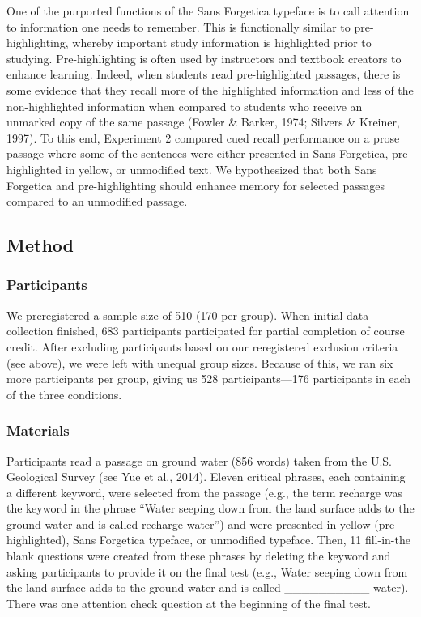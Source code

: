 \documentclass[
  english,
  jou]{apa6}
\begin{document}
One of the purported functions of the Sans Forgetica typeface is to call attention to information one needs to remember. This is functionally similar to pre-highlighting, whereby important study information is highlighted prior to studying. Pre-highlighting is often used by instructors and textbook creators to enhance learning. Indeed, when students read pre-highlighted passages, there is some evidence that they recall more of the highlighted information and less of the non-highlighted information when compared to students who receive an unmarked copy of the same passage (Fowler \& Barker, 1974; Silvers \& Kreiner, 1997). To this end, Experiment 2 compared cued recall performance on a prose passage where some of the sentences were either presented in Sans Forgetica, pre-highlighted in yellow, or unmodified text. We hypothesized that both Sans Forgetica and pre-highlighting should enhance memory for selected passages compared to an unmodified passage.

\hypertarget{method-1}{%
\subsection{Method}\label{method-1}}

\hypertarget{participants-1}{%
\subsubsection{Participants}\label{participants-1}}

We preregistered a sample size of 510 (170 per group). When initial data collection finished, 683 participants participated for partial completion of course credit. After excluding participants based on our reregistered exclusion criteria (see above), we were left with unequal group sizes. Because of this, we ran six more participants per group, giving us 528 participants---176 participants in each of the three conditions.

\hypertarget{materials}{%
\subsubsection{Materials}\label{materials}}

Participants read a passage on ground water (856 words) taken from the U.S. Geological Survey (see Yue et al., 2014). Eleven critical phrases, each containing a different keyword, were selected from the passage (e.g., the term recharge was the keyword in the phrase \enquote{Water seeping down from the land surface adds to the ground water and is called recharge water}) and were presented in yellow (pre-highlighted), Sans Forgetica typeface, or unmodified typeface. Then, 11 fill-in-the blank questions were created from these phrases by deleting the keyword and asking participants to provide it on the final test (e.g., Water seeping down from the land surface adds to the ground water and is called \_\_\_\_\_\_\_\_\_\_ water). There was one attention check question at the beginning of the final test.
\end{document}
